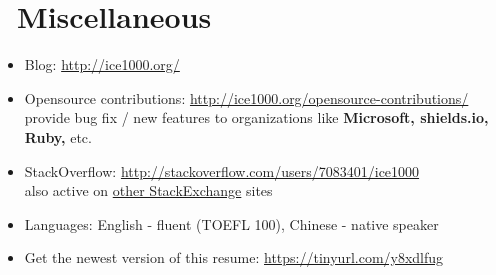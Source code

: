 \documentclass{resume}
\begin{document}

\section{\faInfo\ Miscellaneous}
\begin{itemize}[parsep=0.5ex]
  \item Blog: \url{http://ice1000.org/}
  \item Opensource contributions: \url{http://ice1000.org/opensource-contributions/} \\
    provide bug fix / new features to organizations like \textbf{Microsoft, shields.io, Ruby,} etc.
  \item StackOverflow: \url{http://stackoverflow.com/users/7083401/ice1000} \\
    also active on \href{https://stackexchange.com/users/9532102/ice1000} {other StackExchange} sites
  \item Languages: English - fluent (TOEFL 100), Chinese - native speaker
  \item Get the newest version of this resume: \url{https://tinyurl.com/y8xdlfug}
\end{itemize}

%
%
\end{document}
